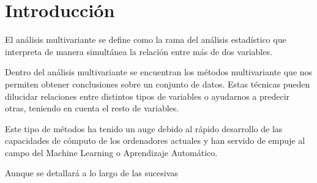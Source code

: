 \chapter*{Introducción}
El análisis multivariante se define como la rama del análisis estadístico que interpreta de manera simultánea la relación entre más de dos variables. 

Dentro del análisis multivariante se encuentran los métodos multivariante que nos permiten obtener conclusiones sobre un conjunto de datos. Estas técnicas pueden dilucidar relaciones entre distintos tipos de variables o ayudarnos a predecir otras, teniendo en cuenta el resto de variables. 

Este tipo de métodos ha tenido un auge debido al rápido desarrollo de las capacidades de cómputo de los ordenadores actuales y han servido de empuje al campo del Machine Learning o Aprendizaje Automático. 

Aunque se detallará a lo largo de las sucesivas 

